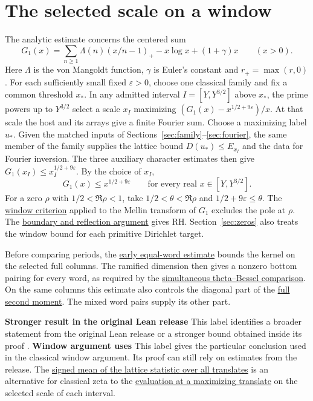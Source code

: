 \documentclass[11pt,a4paper]{article}
\newcommand{\rhscopelabel}[2]{%
  {\setlength{\fboxsep}{2pt}\colorbox{#1}{%
    \small\sffamily\bfseries\color{PageInk}#2}}}
\begin{document}
\section*{The selected scale on a window}
The analytic estimate concerns the centered sum
\begin{equation}
\label{eq:principal-ramp}
  G_1(x)=\sum_{n\ge1}\Lambda(n)(x/n-1)_+-x\log x+(1+\gamma)x
  \qquad(x>0).
\end{equation}
Here \(\Lambda\) is the von Mangoldt function, \(\gamma\) is Euler's
constant and \(r_+=\max(r,0)\). For each sufficiently small fixed
\(\varepsilon>0\), choose one classical family and fix a common
threshold \(x_*\). In any admitted interval \(I=[Y,Y^{3/2}]\)
above \(x_*\), the prime powers up to \(Y^{3/2}\) select a scale
\(x_I\) maximizing \((G_1(x)-x^{1/2+9\varepsilon})/x\).
At that scale the host and its arrays give a finite Fourier sum.
Choose a maximizing label \(u_*\). Given the matched inputs of
Sections~\ref{sec:family}--\ref{sec:fourier}, the same member of the
family supplies the lattice bound \(D(u_*)\le E_{x_I}\) and the data for
Fourier inversion. The three auxiliary character estimates then give
\(G_1(x_I)\le x_I^{1/2+9\varepsilon}\). By the choice of \(x_I\),
\[
  G_1(x)\le x^{1/2+9\varepsilon}
  \qquad\text{for every real }x\in[Y,Y^{3/2}].
\]
For a zero \(\rho\) with \(1/2<\Re\rho<1\), take
\(1/2<\theta<\Re\rho\) and \(1/2+9\varepsilon\le\theta\).
The \hyperlink{proof.one-sided-window-criterion}{window criterion}
applied to the Mellin transform of \(G_1\) excludes the pole at
\(\rho\). The \hyperlink{proof.zeta-reflection}{boundary and reflection
argument} gives RH. Section~\ref{sec:zeros} also treats the window
bound for each primitive Dirichlet target.

Before comparing periods, the \hyperlink{proof.nonzero-anchor}{early
equal-word estimate} bounds the kernel on the selected full columns.
The ramified dimension then gives a nonzero bottom pairing for every word,
as required by the \hyperlink{proof.relation-transport}{simultaneous
theta--Bessel comparison}. On the same columns this estimate also
controls the diagonal part of the
\hyperlink{proof.full-trace-identity}{full second moment}.
The mixed word pairs supply its other part.

\noindent
\rhscopelabel{TraceTint}{Stronger result in the original Lean release}\enspace
This label identifies a broader statement from the original Lean
release or a stronger bound obtained inside its proof \cite{source}.
\rhscopelabel{FieldTint}{Window argument uses}\enspace
This label gives the particular conclusion used in the classical
window argument. Its proof can still rely on estimates from the release.
The \hyperlink{proof.classical-signed-mean}{signed mean of the lattice
statistic over all translates} is an alternative for classical zeta
to the \hyperlink{proof.classical-maximizing-translate}{evaluation at a
maximizing translate} on the selected scale of each interval.
\par
\end{document}
